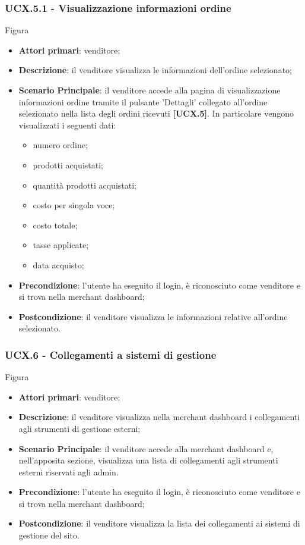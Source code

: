 \subsubsection{UCX.5.1 - Visualizzazione informazioni ordine}
Figura \\
\begin{itemize}
\item \textbf{Attori primari}: venditore;
\item \textbf{Descrizione}: il venditore visualizza le informazioni dell'ordine selezionato;
\item \textbf{Scenario Principale}: il venditore accede alla pagina di visualizzazione informazioni ordine tramite il pulsante 'Dettagli' collegato all'ordine selezionato nella lista degli ordini ricevuti \textbf{[UCX.5]}. In particolare vengono visualizzati i seguenti dati:
\begin{itemize}
	\item numero ordine;
	\item prodotti acquistati;
	\item quantità prodotti acquistati;
	\item costo per singola voce;
	\item costo totale;
	\item tasse applicate;
	\item data acquisto;
\end{itemize}
\item \textbf{Precondizione}: l'utente ha eseguito il login, è riconosciuto come venditore e si trova nella merchant dashboard;
\item \textbf{Postcondizione}: il venditore visualizza le informazioni relative all'ordine selezionato.
\end{itemize}

\subsubsection{UCX.6 - Collegamenti a sistemi di gestione}
Figura \\
\begin{itemize}
\item \textbf{Attori primari}: venditore;
\item \textbf{Descrizione}: il venditore visualizza nella merchant dashboard i collegamenti agli strumenti di gestione esterni;
\item \textbf{Scenario Principale}: il venditore accede alla merchant dashboard e, nell'apposita sezione, visualizza una lista di collegamenti agli strumenti esterni riservati agli admin.
\item \textbf{Precondizione}: l'utente ha eseguito il login, è riconosciuto come venditore e si trova nella merchant dashboard;
\item \textbf{Postcondizione}: il venditore visualizza la lista dei collegamenti ai sistemi di gestione del sito.
\end{itemize}

